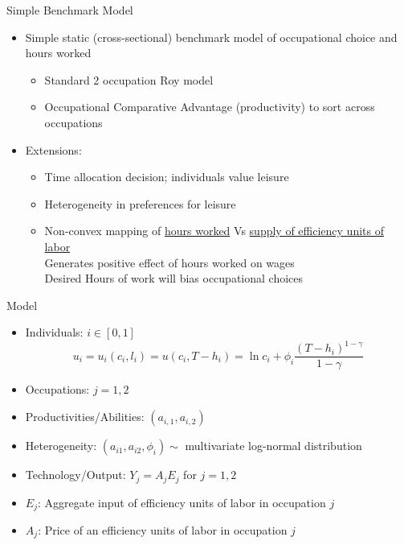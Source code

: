 \documentclass[hyperref={bookmarks=false}]{beamer}
\begin{document}
\begin{frame}{Simple Benchmark Model}
\begin{itemize}
\setlength{\itemsep}{0.35 cm}
\item Simple static (cross-sectional) benchmark model of occupational choice and hours worked
\vfill
\begin{itemize}
\setlength{\itemsep}{0.35 cm}
\item Standard 2 occupation Roy model
\item Occupational Comparative Advantage (productivity) to sort across occupations
\end{itemize}
\item Extensions:
\vfill
\begin{itemize}
\setlength{\itemsep}{0.35 cm}
\item Time allocation decision; individuals value leisure
\item Heterogeneity in preferences for leisure
\item Non-convex mapping of \underline{hours worked} Vs \underline{supply of efficiency units of labor}\\
\vfill
Generates positive effect of hours worked on wages\\
Desired Hours of work will bias occupational choices
\end{itemize}
\end{itemize}
\end{frame}

\begin{frame}{Model}
\begin{itemize}
\setlength{\itemsep}{0.35 cm}
\item Individuals: $i\in[0,1]$
\begin{equation}
u_i = u_{i}(c_i,l_i)=u(c_i,T-h_i)=\ln c_i + \phi_i \frac{(T-h_i)^{1-\gamma}}{1-\gamma}
\end{equation}
\item Occupations: $j=1,2$
\item Productivities/Abilities: $(a_{i,1},a_{i,2})$
\item Heterogeneity: $(a_{i1},a_{i2},\phi_{i})\sim$ multivariate log-normal distribution
\item Technology/Output: $Y_{j}=A_{j}E_{j}$ for $j=1,2$
\item $E_j$: Aggregate input of efficiency units of labor in occupation $j$
\item $A_j$: Price of an efficiency units of labor in occupation $j$
\end{itemize}
\end{frame}
\end{document}
